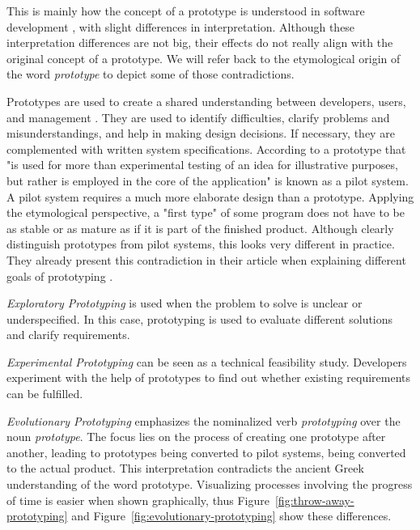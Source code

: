 This is mainly how the concept of a prototype is understood in software development \cite{budde_what_1992}, with slight differences in interpretation.
Although these interpretation differences are not big, their effects do not really align with the original concept of a prototype.
We will refer back to the etymological origin of the word \emph{prototype} to depict some of those contradictions.

Prototypes are used to create a shared understanding between developers, users, and management \cite{budde_what_1992}.
They are used to identify difficulties, clarify problems and misunderstandings, and help in making design decisions.
If necessary, they are complemented with written system specifications.
According to \cite{budde_what_1992} a prototype that "is used for more than experimental testing of an idea for illustrative purposes, but rather is employed in the core of the application" is known as a pilot system.
A pilot system requires a much more elaborate design than a prototype.
Applying the etymological perspective, a "first type" of some program does not have to be as stable or as mature as if it is part of the finished product.
Although \citeauthor{budde_what_1992} clearly distinguish prototypes from pilot systems, this looks very different in practice.
They already present this contradiction in their article when explaining different goals of prototyping \cite{budde_what_1992}.
\begin{enumerate*}[label=(\roman*)]
\item \emph{Exploratory Prototyping} is used when the problem to solve is unclear or underspecified. In this case, prototyping is used to evaluate different solutions and clarify requirements.
\item \emph{Experimental Prototyping} can be seen as a technical feasibility study. Developers experiment with the help of prototypes to find out whether existing requirements can be fulfilled.
\item \emph{Evolutionary Prototyping} emphasizes the nominalized verb \emph{prototyping} over the noun \emph{prototype}. The focus lies on the process of creating one prototype after another, leading to prototypes being converted to pilot systems, being converted to the actual product. This interpretation contradicts the ancient Greek understanding of the word prototype. Visualizing processes involving the progress of time is easier when shown graphically, thus Figure~\ref{fig:throw-away-prototyping} and Figure~\ref{fig:evolutionary-prototyping} show these differences.
\end{enumerate*}

